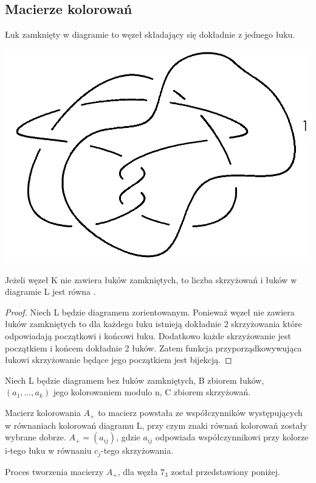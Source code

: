 \subsection{Macierze kolorowań}
\begin{definicja}
Łuk zamknięty w diagramie to węzeł składający się dokładnie z jednego łuku.
\end{definicja}
\begin{center}
\includegraphics[scale=0.2]{2/Obrazy/Clossedcurve} \\

\end{center}

\begin{lemat}
Jeżeli węzeł K nie zawiera łuków zamkniętych, to liczba skrzyżowań i łuków w diagramie L jest równa .
\end{lemat}
\begin{proof}
Niech L będzie diagramem zorientowanym. Ponieważ węzeł nie zawiera łuków zamkniętych to dla każdego łuku istnieją dokładnie 2 skrzyżowania które odpowiadają początkowi i końcowi łuku. Dodatkowo każde skrzyżowanie jest początkiem i końcem dokładnie 2 łuków. Zatem funkcja przyporządkowywująca łukowi skrzyżowanie będące jego początkiem jest bijekcją.
\end{proof}


Niech L będzie diagramem bez łuków zamkniętych, B zbiorem łuków, $( a_{1}, \ldots, a_{k})$ jego kolorowaniem modulo n, C zbiorem skrzyżowań.  
\begin{definicja}
Macierz kolorowania $A_{+}$ to macierz powstała ze współczynników występujących w równaniach kolorowań diagramu L, przy czym znaki równań kolorowań zostały wybrane dobrze. $A_{+}=(a_{ij})$, gdzie  $a_{ij}$ odpowiada współczynnikowi przy kolorze i-tego łuku w równaniu $c_{j}$-tego skrzyżowania. 
\end{definicja}
Proces tworzenia macierzy $A_{+}$, dla węzła $7_{3}$ został przedstawiony poniżej. \\

